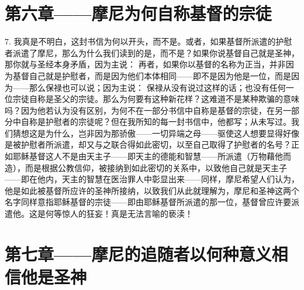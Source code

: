 
\section{第六章——摩尼为何自称基督的宗徒}

7. 我真是不明白，这封书信为何以开头，而不是。或者，如果基督所派遣的护慰者派遣了摩尼，那么为什么我们读到的是，而不是？如果你说基督自己就是圣神，那你就与圣经本身矛盾，因为主说： 再者，如果你以基督的名称为正当，并非因为基督自己就是护慰者，而是因为他们本体相同——即不是因为他是一位，而是因为——那么保禄也可以说；因为主说： 保禄从没有说过这样的话；也没有任何一位宗徒自称是圣父的宗徒。那么为何要有这种新花样？这难道不是某种欺骗的意味吗？因为他若认为没有区别，为何不在一部分书信中自称是基督的宗徒，在另一部分中自称是护慰者的宗徒呢？但在我所知的每一封书信中，他都写；从未写过。我们猜想这是为什么，岂非因为那骄傲——一切异端之母——驱使这人想要显得好像是被护慰者所派遣，却又与之联合得如此密切，以至自己取得了护慰者的名号？正如耶稣基督这人不是由天主子——即天主的德能和智慧——所派遣（万物藉他而造），而是根据公教信仰，被接纳到如此密切的关系中，以致他自己就是天主子——即在他内，天主的智慧在医治罪人中彰显出来——同样，摩尼希望人们认为，他是如此被基督所应许的圣神所接纳，以致我们从此就理解为，摩尼和圣神这两个名字同样意指耶稣基督的宗徒——即由耶稣基督所派遣的那一位，基督曾应许要派遣他。这是何等惊人的狂妄！真是无法言喻的亵渎！\par


\section{第七章——摩尼的追随者以何种意义相信他是圣神}

